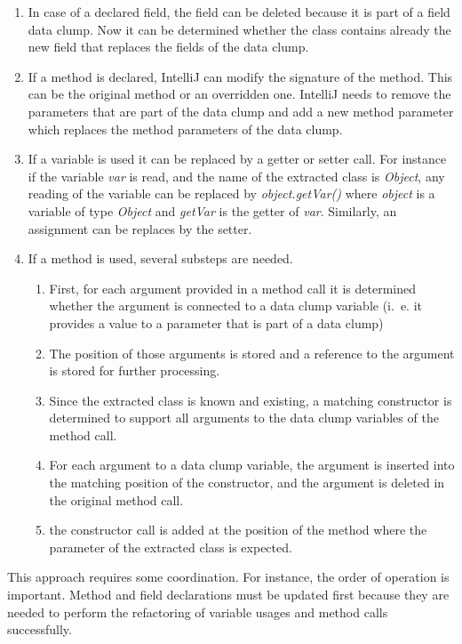 \begin{enumerate}
    \item In case of a declared field, the field can be deleted because it is part of a field data clump. Now it can be determined whether the class contains already the new field that replaces the fields of the data clump.
    \item If a method is declared, IntelliJ can modify the signature of the method. This can be the original method or an overridden one. IntelliJ needs to remove the parameters that are part of the data clump and add a new method parameter which replaces the method parameters of the data clump. 
    \item If a variable is used it can be replaced by a getter or setter call. For instance if the variable \textit{var} is read, and the name of the extracted class is \textit{Object}, any reading of the variable can be replaced by  \textit{object.getVar()} where \textit{object} is a variable of type \textit{Object} and \textit{getVar} is the getter of \textit{var}. Similarly, an assignment can be replaces by the setter.
    \item If a method is used, several substeps are needed.
    \begin{enumerate}
        \item First, for each argument provided in a method call it is determined whether the argument is connected to a data clump variable (i.~e. it provides a value to a parameter that is part of a data clump) 
        \item The position of those arguments is stored and a reference to the argument is stored for further processing.
        \item Since the extracted class is known and existing, a matching constructor is determined to support all arguments to the data clump variables of the method call. 
        \item For each argument to a data clump variable, the argument is inserted into the matching position of the constructor, and the argument is deleted in the original method call. 
        \item the constructor call is added at the position of the method  where the parameter of the extracted class is expected. 
        
    \end{enumerate}
    
\end{enumerate}

This approach requires some coordination. For instance, the order of operation is important. Method and field declarations must be updated first because they are needed to perform the refactoring of variable usages and method calls successfully. 

